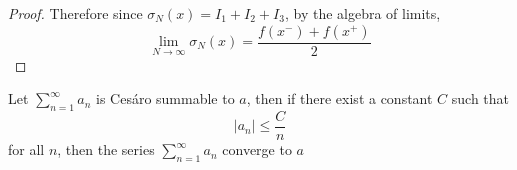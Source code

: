 \begin{proof}
    Therefore since $\sigma_N(x) = I_1 + I_2 + I_3$, by the algebra of limits, 
    $$ \lim_{N \to \infty} \sigma_N(x) = \frac{f(x^-) + f(x^+)}{2}$$
  \end{proof}

 \begin{theorem}
   Let $\sum_{n=1}^\infty a_n$ is Ces\'aro summable to $a$, then if there exist a constant $C$ such that $$|a_n| \le \frac{C}{n}$$ for all $n$, then the series $\sum_{n=1}^\infty a_n$ converge to $a$
 \end{theorem}
